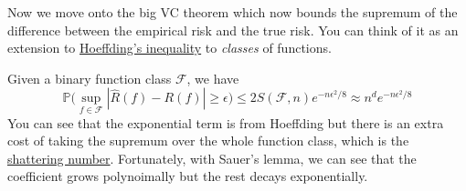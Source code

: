   Now we move onto the big VC theorem which now bounds the supremum of the difference between the empirical risk and the true risk. You can think of it as an extension to \hyperref[thm:hoeffdings-inequality]{Hoeffding's inequality} to \textit{classes} of functions. 

  \begin{theorem}[VC Theorem]
    \label{thm:vc-theorem}
    Given a binary function class $\mathcal{F}$, we have
    \begin{equation}
      \mathbb{P} \bigg( \sup_{f \in \mathcal{F}} | \hat{R} (f) - R(f) | \geq \epsilon \bigg) \leq 2 S(\mathcal{F}, n) e^{-n \epsilon^2 / 8} \approx n^d e^{-n \epsilon^2 / 8}
    \end{equation}
    You can see that the exponential term is from Hoeffding but there is an extra cost of taking the supremum over the whole function class, which is the \hyperref[def:shattering-number]{shattering number}. Fortunately, with Sauer's lemma, we can see that the coefficient grows polynoimally but the rest decays exponentially. 
  \end{theorem}
